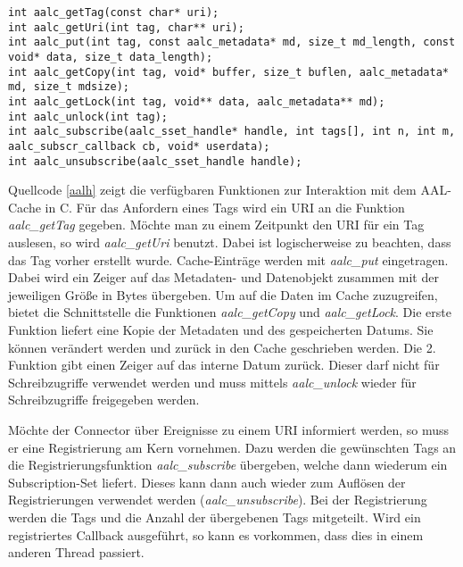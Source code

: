 \lstset{language=C}
\begin{lstlisting}[frame=single,caption={C-Schnittstelle von AAL-Cache},label={aalh}]
int aalc_getTag(const char* uri);
int aalc_getUri(int tag, char** uri);
int aalc_put(int tag, const aalc_metadata* md, size_t md_length, const void* data, size_t data_length);
int aalc_getCopy(int tag, void* buffer, size_t buflen, aalc_metadata* md, size_t mdsize);
int aalc_getLock(int tag, void** data, aalc_metadata** md);
int aalc_unlock(int tag);
int aalc_subscribe(aalc_sset_handle* handle, int tags[], int n, int m, aalc_subscr_callback cb, void* userdata);
int aalc_unsubscribe(aalc_sset_handle handle);
\end{lstlisting}

Quellcode \ref{aalh} zeigt die verfügbaren Funktionen zur Interaktion mit dem AAL-Cache in C.
Für das Anfordern eines Tags wird ein URI an die Funktion \emph{aalc\_getTag} gegeben.
Möchte man zu einem Zeitpunkt den URI für ein Tag auslesen, so wird \emph{aalc\_getUri} benutzt.
Dabei ist logischerweise zu beachten, dass das Tag vorher erstellt wurde.
Cache-Einträge werden mit \emph{aalc\_put} eingetragen.
Dabei wird ein Zeiger auf das Metadaten- und Datenobjekt zusammen mit der jeweiligen
Größe in Bytes übergeben.
Um auf die Daten im Cache zuzugreifen, bietet die Schnittstelle die Funktionen \emph{aalc\_getCopy}
und \emph{aalc\_getLock}.
Die erste Funktion liefert eine Kopie der Metadaten und des gespeicherten Datums.
Sie können verändert werden und zurück in den Cache geschrieben werden.
Die 2. Funktion gibt einen Zeiger auf das interne Datum zurück.
Dieser darf nicht für Schreibzugriffe verwendet werden und muss mittels \emph{aalc\_unlock}
wieder für Schreibzugriffe freigegeben werden.

Möchte der Connector über Ereignisse zu einem URI informiert werden, so muss er
eine Registrierung am Kern vornehmen.
Dazu werden die gewünschten Tags an die Registrierungsfunktion \emph{aalc\_subscribe} übergeben,
welche dann wiederum ein Subscription-Set liefert.
Dieses kann dann auch wieder zum Auflösen der Registrierungen verwendet werden (\emph{aalc\_unsubscribe}).
Bei der Registrierung werden die Tags und die Anzahl der übergebenen Tags mitgeteilt.
Wird ein registriertes Callback ausgeführt, so kann es vorkommen, dass dies in einem anderen
Thread passiert.

